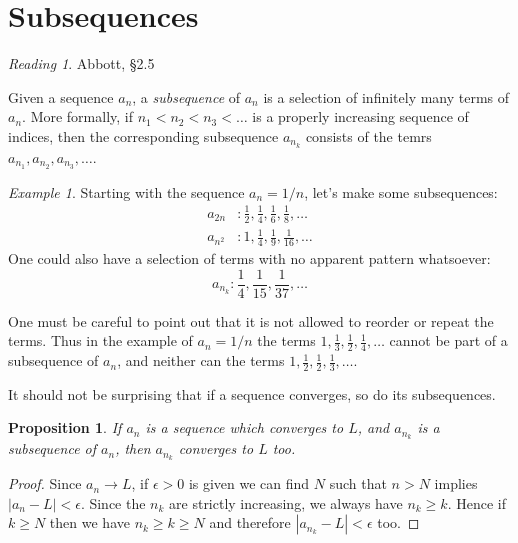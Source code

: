 \documentclass[11pt,oneside]{amsbook}
\theoremstyle{definition}
\theoremstyle{plain}
\newtheorem{prop}[thm]{Proposition}
\theoremstyle{definition}
\theoremstyle{remark}
\newtheorem{example}[thm]{Example}
\newtheorem*{reading}{Reading}
\numberwithin{equation}{section}
\numberwithin{figure}{section}
\begin{document}
\newpage
\section{Subsequences}

\begin{reading}
  Abbott, \S 2.5
\end{reading}

Given a sequence $a_n$, a \emph{subsequence} of $a_n$ is a selection of infinitely many terms of $a_n$. More formally, if $n_1<n_2<n_3<\ldots$ is a properly increasing sequence of indices, then the corresponding subsequence $a_{n_k}$ consists of the temrs $a_{n_1},a_{n_2},a_{n_3},\ldots$.

\begin{example}
  Starting with the sequence $a_n=1/n$, let's make some subsequences:
  \begin{align*}
    a_{2n}&: \frac12, \frac14, \frac16, \frac18, \ldots\\
    a_{n^2}&: 1, \frac14, \frac19, \frac1{16}, \ldots
  \end{align*}
  One could also have a selection of terms with no apparent pattern whatsoever:
  \[a_{n_k}:\frac14, \frac{1}{15}, \frac{1}{37},\ldots
  \]
\end{example}

One must be careful to point out that it is not allowed to reorder or repeat the terms. Thus in the example of $a_n=1/n$ the terms $1,\frac13,\frac12,\frac14,\ldots$ cannot be part of a subsequence of $a_n$, and neither can the terms $1,\frac12,\frac12,\frac13,\ldots$.

It should not be surprising that if a sequence converges, so do its subsequences.

\begin{prop}
  \label{prop:subsequence}
  If $a_n$ is a sequence which converges to $L$, and $a_{n_k}$ is a subsequence of $a_n$, then $a_{n_k}$ converges to $L$ too.
\end{prop}

\begin{proof}
  Since $a_n\to L$, if $\epsilon>0$ is given we can find $N$ such that $n>N$ implies $|a_n-L|<\epsilon$. Since the $n_k$ are strictly increasing, we always have $n_k\geq k$. Hence if $k\geq N$ then we have $n_k\geq k\geq N$ and therefore $|a_{n_k}-L|<\epsilon$ too.
\end{proof}
\end{document}
